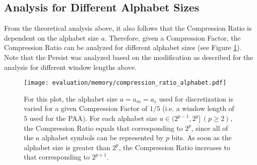 \subsection*{Analysis for Different Alphabet Sizes}
From the theoretical analysis above, it also follows that the Compression Ratio is dependent on the alphabet size $a$. Therefore, given a Compression Factor, the Compression Ratio can be analyzed for different alphabet sizes (see Figure \ref{fig:compression_ratio_alphabet}). Note that the Persist was analyzed based on the modification as described for the analysis for different window lengths above.
\begin{figure}[htb]
\centering
\texttt{[image: evaluation/memory/compression\_ratio\_alphabet.pdf]}
\caption[Memory Requirements - Effect of Alphabet Size]{For this plot, the alphabet size $a = a_m = a_s$ used for discretization is varied for a given Compression Factor of $1/5$ (i.e. a window length of $5$ used for the \ac{PAA}). For each alphabet size $a \in (2^{p-1},2^p] \ (p \geq 2)$, the Compression Ratio equals that corresponding to $2^p$, since all of the $a$ alphabet symbols can be represented by $p$ bits. As soon as the alphabet size is greater than $2^p$, the Compression Ratio increases to that corresponding to $2^{p+1}$.}
\label{fig:compression_ratio_alphabet}
\end{figure}